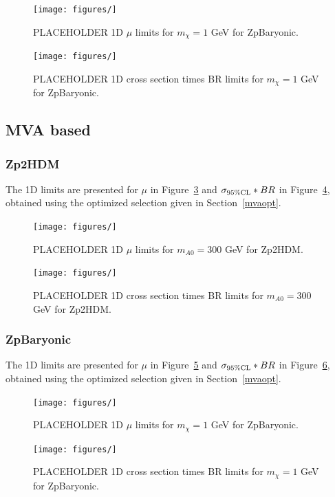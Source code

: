 \begin{figure}[tbh]
\centering
\texttt{[image: figures/]}
\caption{PLACEHOLDER 1D $\mu$ limits for $m_{\chi} = 1$ GeV for ZpBaryonic.}
\label{fig:limzpbaryonicmu}
\end{figure}

\begin{figure}[tbh]
\centering
\texttt{[image: figures/]}
\caption{PLACEHOLDER 1D cross section times BR limits for $m_{\chi} = 1$ GeV for ZpBaryonic.}
\label{fig:limzpbaryonic}
\end{figure}

\subsection{MVA based}

\subsubsection{Zp2HDM}

The 1D limits are presented for $\mu$ in Figure~\ref{fig:limzp2hdmmu} and $\sigma_{95\% \rm{CL}}*BR$ in Figure~\ref{fig:limzp2hdm}, obtained using the optimized selection given in Section~\ref{mvaopt}.

\begin{figure}[tbh]
\centering
\texttt{[image: figures/]}
\caption{PLACEHOLDER 1D $\mu$ limits for $m_{A0} = 300$ GeV for Zp2HDM.}
\label{fig:limzp2hdmmu}
\end{figure}

\begin{figure}[tbh]
\centering
\texttt{[image: figures/]}
\caption{PLACEHOLDER 1D cross section times BR limits for $m_{A0} = 300$ GeV for Zp2HDM.}
\label{fig:limzp2hdm}
\end{figure}

\subsubsection{ZpBaryonic}

The 1D limits are presented for $\mu$ in Figure~\ref{fig:limzpbaryonicmu} and $\sigma_{95\% \rm{CL}}*BR$ in Figure~\ref{fig:limzpbaryonic}, obtained using the optimized selection given in Section~\ref{mvaopt}.

\begin{figure}[tbh]
\centering
\texttt{[image: figures/]}
\caption{PLACEHOLDER 1D $\mu$ limits for $m_{\chi} = 1$ GeV for ZpBaryonic.}
\label{fig:limzpbaryonicmu}
\end{figure}

\begin{figure}[tbh]
\centering
\texttt{[image: figures/]}
\caption{PLACEHOLDER 1D cross section times BR limits for $m_{\chi} = 1$ GeV for ZpBaryonic.}
\label{fig:limzpbaryonic}
\end{figure}


